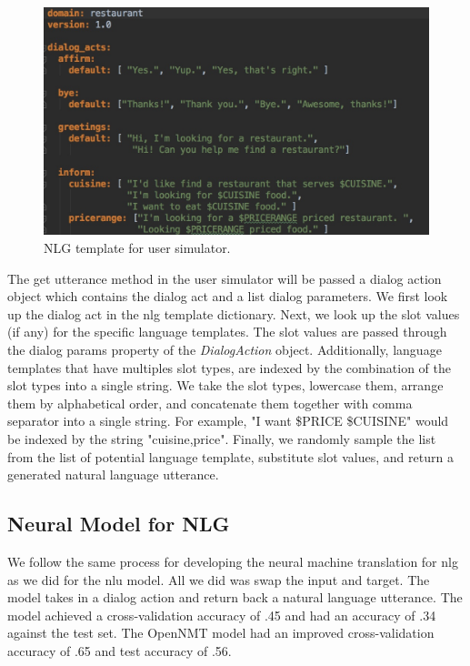 \begin{figure}[h!]
	\centering
	\includegraphics[scale=.35]{diagrams/nlg_template_restaurant.jpeg}
	\caption{ NLG template for user simulator. }
	\label{fig:res_nlg}
\end{figure}

The get utterance method in the user simulator will be passed a dialog action object which contains the dialog act and a list dialog parameters. We first look up the dialog act in the nlg template dictionary. Next, we look up the slot values (if any) for the specific language templates. The slot values are passed through the dialog params property of the \textit{DialogAction} object. Additionally, language templates that have multiples slot types, are indexed by the combination of the slot types into a single string. We take the slot types, lowercase them, arrange them by alphabetical order, and concatenate them together with comma separator into a single string. For example, "I want \$PRICE \$CUISINE" would be indexed by the string "cuisine,price". Finally, we randomly sample the list from the list of potential language template, substitute slot values, and return a generated natural language utterance. 


\subsection{Neural Model for NLG}

We follow the same process for developing the neural machine translation for nlg as we did for the nlu model. All we did was swap the input and target. The model takes in a dialog action and return back a natural language utterance. The \cite{brownlee_2017} model achieved a cross-validation accuracy of .45 and had an accuracy of .34 against the test set. The OpenNMT model had an improved cross-validation accuracy of .65 and test accuracy of .56.  

